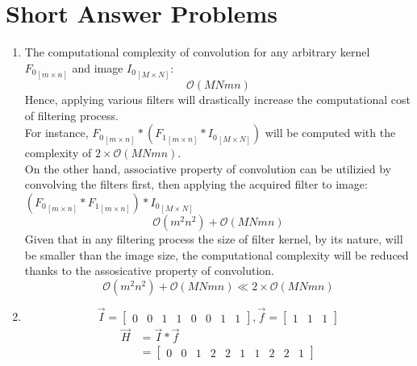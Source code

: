 \documentclass{article}
\begin{document}
\section{Short Answer Problems}
\begin{enumerate}
	\item The computational complexity of convolution for any arbitrary
	kernel ${F_0}_{[m\times n]}$ and image ${I_0}_{[M\times N]}$:
	$$\mathcal{O}(MNmn)$$
	Hence, applying various filters will drastically increase
	the computational cost of filtering process.\\
	For instance, ${F_0}_{[m\times n]} \ast ({F_1}_{[m\times n]} \ast
	{I_0}_{[M\times N]})$ will be computed with the complexity of $2 \times
	\mathcal{O}(MNmn)$. \\
	On the other hand, associative property of convolution can be
	utilizied by convolving the filters first, then applying the acquired filter to
	image:
	$({F_0}_{[m\times n]} \ast {F_1}_{[m\times n]}) \ast
	{I_0}_{[M\times N]}$ $$\mathcal{O}(m^2n^2) + \mathcal{O}(MNmn)$$
	Given that in any filtering process the size of filter
	kernel, by its nature, will be smaller than the image size, the computational
	complexity will be reduced thanks to the assosicative property of convolution.
	$$\mathcal{O}{(m^2n^2)} + \mathcal{O}(MNmn) \ll 2 \times \mathcal{O}(MNmn)$$
	\item 
	$$\vec{I} = \begin{bmatrix} 0 & 0 & 1 & 1 & 0 & 0 & 1 & 1\end{bmatrix}
	, \vec{f}= \begin{bmatrix} 1 & 1 & 1\end{bmatrix}$$
	\begin{equation} 
	\begin{split}
	\vec{H} & = \vec{I} \ast \vec{f} \\
	& = \begin{bmatrix} 0 & 0 & 1 & 2 & 2 & 1 & 1 & 2 & 2 & 1 \end{bmatrix}
	\end{split}
	\end{equation}

\end{enumerate}
\end{document}
